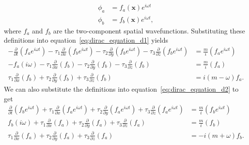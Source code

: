 \documentclass[titlepage,letterpaper,onecolumn,11pt,final]{report}
\numberwithin{equation}{section}
\numberwithin{figure}{section}
\begin{document}
\begin{subequations}
\begin{align}
	\phi_{a} &= f_{a} (\mathbf{x}) e^{i \omega t} \\
	\phi_{b} &= f_{b} (\mathbf{x}) e^{i \omega t},
\end{align}
\end{subequations}
%
where $f_{a}$ and $f_{b}$ are the two-component spatial wavefunctions. Substituting these definitions into equation~\ref{eq:dirac_equation_d1} yields
\begin{equation}
\begin{split}
	\label{eq:dirac_long_e1}
	- \frac{\partial}{\partial t} \left( f_{a} e^{i \omega t} \right) - \tau_{1} \frac{\partial}{\partial x} \left( f_{b} e^{i \omega t} \right) - \tau_{2} \frac{\partial}{\partial y} \left( f_{b} e^{i \omega t} \right) - \tau_{3} \frac{\partial}{\partial z} \left( f_{b} e^{i \omega t} \right) &= \frac{m}{i} \left( f_{a} e^{i \omega t} \right)  \\
	- f_{a} \left( i \omega \right) - \tau_{1} \frac{\partial}{\partial x} \left( f_{b} \right) - \tau_{2} \frac{\partial}{\partial y} \left( f_{b} \right) - \tau_{3} \frac{\partial}{\partial z} \left( f_{b} \right) &= \frac{m}{i} \left( f_{a} \right) \\
	\tau_{1} \frac{\partial}{\partial x} \left( f_{b} \right) + \tau_{2} \frac{\partial}{\partial y} \left( f_{b} \right) + \tau_{3} \frac{\partial}{\partial z} \left( f_{b} \right) &= i \left( m - \omega \right) f_{a} .
\end{split}
\end{equation}
%
We can also substitute the definitions into equation~\ref{eq:dirac_equation_d2} to get
\begin{equation}
\begin{split}
	\label{eq:dirac_long_e2}
	\frac{\partial}{\partial t} \left( f_{b} e^{i \omega t} \right) + \tau_{1} \frac{\partial}{\partial x} \left( f_{a} e^{i \omega t} \right) + \tau_{2} \frac{\partial}{\partial y} \left( f_{a} e^{i \omega t} \right) + \tau_{3} \frac{\partial}{\partial z} \left( f_{a} e^{i \omega t} \right) &= \frac{m}{i} \left( f_{b} e^{i \omega t} \right)  \\
	f_{b} \left( i \omega \right) + \tau_{1} \frac{\partial}{\partial x} \left( f_{a} \right) + \tau_{2} \frac{\partial}{\partial y} \left( f_{a} \right) + \tau_{3} \frac{\partial}{\partial z} \left( f_{a} \right) &= \frac{m}{i} \left( f_{b} \right) \\
	\tau_{1} \frac{\partial}{\partial x} \left( f_{a} \right) + \tau_{2} \frac{\partial}{\partial y} \left( f_{a} \right) + \tau_{3} \frac{\partial}{\partial z} \left( f_{a} \right) &= -i \left( m + \omega \right) f_{b}.
\end{split}
\end{equation}
\end{document}
